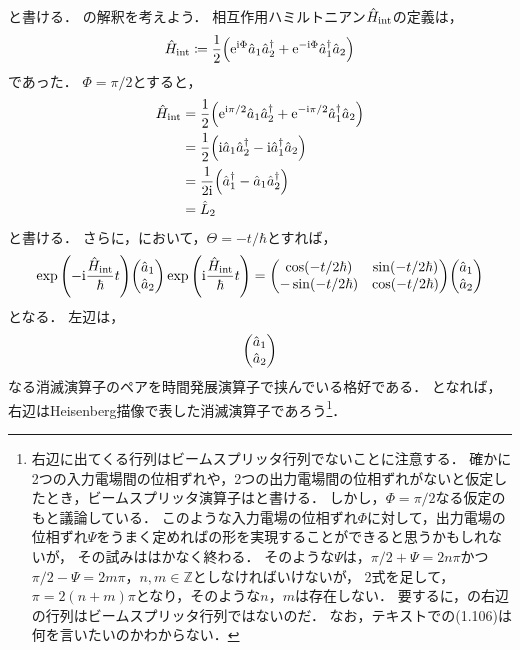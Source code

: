 \documentclass{report}
\begin{document}
    と書ける．
    の解釈を考えよう．
    相互作用ハミルトニアン$\hat{H}_{\mathrm{int}}$の定義は，
    \begin{align}
      \hat{H}_{\mathrm{int}} \coloneqq \frac{1}{2}\qty(\mathrm{e}^{\mathrm{i}\Phi}\hat{a}_1\hat{a}_2^{\dag} + \mathrm{e}^{-\mathrm{i}\Phi}\hat{a}_1^{\dag}\hat{a}_2)
    \end{align}
    であった．
    $\Phi = \pi / 2$とすると，
    \begin{align}
      \hat{H}_{\mathrm{int}} &= \frac{1}{2}\qty(\mathrm{e}^{\mathrm{i}\pi / 2}\hat{a}_1\hat{a}_2^{\dag} + \mathrm{e}^{-\mathrm{i}\pi / 2}\hat{a}_1^{\dag}\hat{a}_2) \\ 
      &= \frac{1}{2}\qty(\mathrm{i}\hat{a}_1\hat{a}_2^{\dag} - \mathrm{i}\hat{a}_1^{\dag}\hat{a}_2) \\ 
      &= \frac{1}{2\mathrm{i}}\qty(\hat{a}_1^{\dag} - \hat{a}_1\hat{a}_2^{\dag}) \\ 
      &= \hat{L}_2
    \end{align}
    と書ける．
    さらに，において，$\Theta = -t / \hbar$とすれば，
    \begin{align}
      \exp\qty(-\i\frac{\hat{H}_{\r{int}}}{\hbar}t)\mqty(\hat{a}_1 \\ \hat{a}_2)\exp\qty(\i\frac{\hat{H}_{\r{int}}}{\hbar}t) = \mqty(
        \cos(-t / 2\hbar) & \sin(-t / 2\hbar) \\ 
        -\sin(-t / 2\hbar) & \cos(-t / 2\hbar)
      )\mqty(\hat{a}_1 \\ \hat{a}_2)
    \end{align}
    となる．
    左辺は，
    \begin{align}
      \mqty(\hat{a}_1 \\ \hat{a}_2)
    \end{align}
    なる消滅演算子のペアを時間発展演算子で挟んでいる格好である．
    となれば，右辺はHeisenberg描像で表した消滅演算子であろう\footnote{
      右辺に出てくる行列はビームスプリッタ行列でないことに注意する．
      確かに2つの入力電場間の位相ずれや，2つの出力電場間の位相ずれがないと仮定したとき，ビームスプリッタ演算子はと書ける．
      しかし，$\Phi = \pi / 2$なる仮定のもと議論している．
      このような入力電場の位相ずれ$\Phi$に対して，出力電場の位相ずれ$\Psi$をうまく定めればの形を実現することができると思うかもしれないが，
      その試みははかなく終わる．
      そのような$\Psi$は，$\pi / 2 + \Psi = 2n\pi$かつ$\pi / 2 - \Psi = 2m\pi$，$n, m \in \mathbb{Z}$としなければいけないが，
      2式を足して，$\pi = 2(n + m)\pi$となり，そのような$n$，$m$は存在しない．
      要するに，の右辺の行列はビームスプリッタ行列ではないのだ．
      なお，テキストでの(1.106)は何を言いたいのかわからない．
      }．
\end{document}
